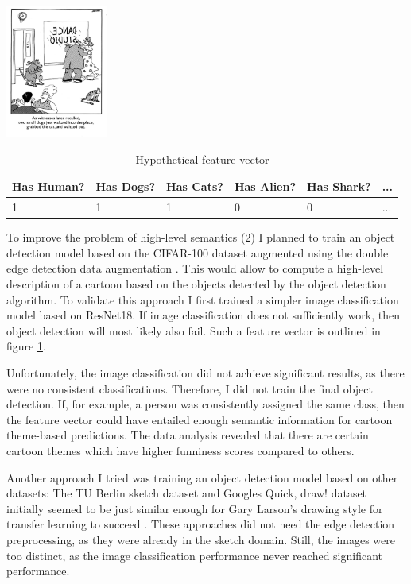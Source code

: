 \documentclass[draft,final,oneside]{vutinfth} %
\begin{document}
\begin{table}[]
\centering
\includegraphics[width=0.25\textwidth]{graphics/example_cartoon.png}
\begin{tabular}{|l|l|l|l|l|l|}
\hline
Has Human? & Has Dogs? & Has Cats? & Has Alien? & Has Shark? & ... \\ \hline
1   & 1 & 1 & 0 & 0 & ... \\
\hline
\end{tabular}
\caption{Hypothetical feature vector}
\label{objectdetectionfeaturevector}
\end{table}

To improve the problem of high-level semantics (2) I planned to train an object detection model based on the CIFAR-100 dataset augmented using the double edge detection data augmentation \cite{cifar100}. This would allow to compute a high-level description of a cartoon based on the objects detected by the object detection algorithm. To validate this approach I first trained a simpler image classification model based on ResNet18. If image classification does not sufficiently work, then object detection will most likely also fail. Such a feature vector is outlined in figure \ref{objectdetectionfeaturevector}.

Unfortunately, the image classification did not achieve significant results, as there were no consistent classifications. Therefore, I did not train the final object detection. If, for example, a person was consistently assigned the same class, then the feature vector could have entailed enough semantic information for cartoon theme-based predictions. The data analysis revealed that there are certain cartoon themes which have higher funniness scores compared to others. 

Another approach I tried was training an object detection model based on other datasets: The TU Berlin sketch dataset and Googles Quick, draw! dataset initially seemed to be just similar enough for Gary Larson's drawing style for transfer learning to succeed \cite{tuberlin}\cite{quickdraw}. These approaches did not need the edge detection preprocessing, as they were already in the sketch domain. Still, the images were too distinct, as the image classification performance never reached significant performance.
\end{document}
